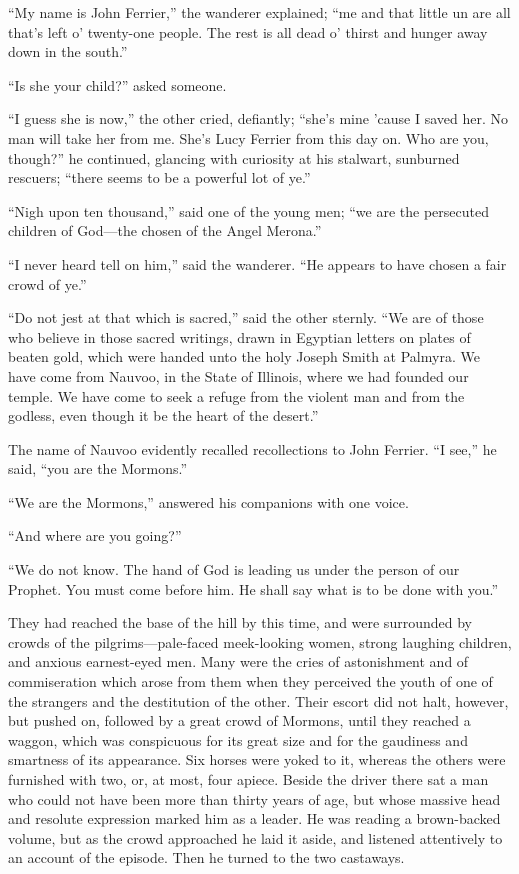 \documentclass[12pt,english,oneside]{book}
\newcommand{\mdsh}[1]{\mbox{#1}\linebreak[1]}
\begin{document}
{}``My name is John Ferrier,'' the wanderer explained; {}``me and
that little un are all that's left o' twenty-one people. The rest
is all dead o' thirst and hunger away down in the south.''

{}``Is she your child?'' asked someone.

{}``I guess she is now,'' the other cried, defiantly; {}``she's
mine 'cause I saved her. No man will take her from me. She's Lucy
Ferrier from this day on. Who are you, though?'' he continued, glancing
with curiosity at his stalwart, sunburned rescuers; {}``there seems
to be a powerful lot of ye.''

{}``Nigh upon ten thousand,'' said one of the young men; {}``we
are the persecuted children of God\mdsh{---}the chosen of the Angel
Merona.''

{}``I never heard tell on him,'' said the wanderer. {}``He appears
to have chosen a fair crowd of ye.''

{}``Do not jest at that which is sacred,'' said the other sternly.
{}``We are of those who believe in those sacred writings, drawn in
Egyptian letters on plates of beaten gold, which were handed unto
the holy Joseph Smith at Palmyra. We have come from Nauvoo, in the
State of Illinois, where we had founded our temple. We have come to
seek a refuge from the violent man and from the godless, even though
it be the heart of the desert.''

The name of Nauvoo evidently recalled recollections to John Ferrier.
{}``I see,'' he said, {}``you are the Mormons.''

{}``We are the Mormons,'' answered his companions with one voice.

{}``And where are you going?''

{}``We do not know. The hand of God is leading us under the person
of our Prophet. You must come before him. He shall say what is to
be done with you.''

They had reached the base of the hill by this time, and were surrounded
by crowds of the pilgrims\mdsh{---}pale-faced meek-looking women,
strong laughing children, and anxious earnest-eyed men. Many were
the cries of astonishment and of commiseration which arose from them
when they perceived the youth of one of the strangers and the destitution
of the other. Their escort did not halt, however, but pushed on, followed
by a great crowd of Mormons, until they reached a waggon, which was
conspicuous for its great size and for the gaudiness and smartness
of its appearance. Six horses were yoked to it, whereas the others
were furnished with two, or, at most, four apiece. Beside the driver
there sat a man who could not have been more than thirty years of
age, but whose massive head and resolute expression marked him as
a leader. He was reading a brown-backed volume, but as the crowd approached
he laid it aside, and listened attentively to an account of the episode.
Then he turned to the two castaways.
\end{document}
